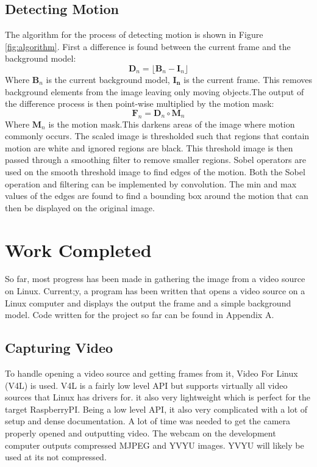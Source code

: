 \documentclass[journal]{IEEEtran}
\begin{document}
    \subsection{Detecting Motion}
    The algorithm for the process of detecting motion is shown in Figure \ref{fig:algorithm}. First a difference is found between the
    current frame and the background model:
    $$
    \mathbf{D}_n = \lfloor\mathbf{B}_n - \mathbf{I}_n\rfloor
    $$
    Where $\mathbf{B}_n$ is the current background model, $\mathbf{I_n}$ is the current frame. This removes background elements from the image leaving only moving objects.The output of the difference process is then point-wise multiplied by the motion mask:
    $$
    \mathbf{F}_n = \mathbf{D}_n \circ \mathbf{M}_n
    $$
    Where $\mathbf{M}_n$ is the motion mask.This darkens areas of the image where motion commonly occurs. The scaled image is thresholded such
    that regions that contain motion are white and ignored regions are black.
    This threshold  image is then passed through a smoothing filter to remove smaller regions. Sobel operators are used on the smooth threshold
    image to find edges of the motion. Both the Sobel operation and filtering can be implemented by convolution. The min and max values of the edges are found to find a bounding box around the motion that can then be displayed on the original image.

    \section{Work Completed}
    So far, most progress has been made in gathering the image from a video source on Linux. Current;y, a program has
    been written that opens a video source on a Linux computer and displays the output the frame and a simple background model. Code
    written for the project so far can be found in Appendix A.

    \subsection{Capturing Video}
    To handle opening a video source and getting frames from it, Video For Linux (V4L) is used. V4L is a fairly low level API but
    supports virtually all video sources that Linux has drivers for. it also very lightweight which is perfect for the target
    RaspberryPI. Being a low level API, it also very complicated with a lot of setup and dense documentation. A lot of time was needed to get the camera  properly opened and outputting video. The webcam on the development computer outputs compressed MJPEG
    and YVYU images. YVYU will likely be used at its not compressed.
\end{document}

